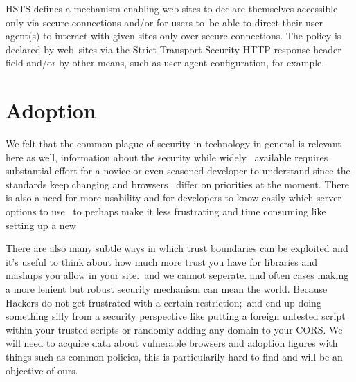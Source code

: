 HSTS defines a mechanism enabling web sites to declare themselves accessible only via secure connections and/or for users to\
be able to direct their user agent(s) to interact with given sites only over secure connections. The policy is declared by web\
sites via the Strict-Transport-Security HTTP response header field and/or by other means, such as user agent configuration, for example.\\

\section{Adoption}

We felt that the common plague of security in technology in general is relevant here as well, information about the security while widely \
available requires substantial effort for a novice or even seasoned developer to understand since the standards keep changing and browsers \
differ on priorities at the moment. There is also a need for more usability and for developers to know easily which server options to use \
to perhaps make it less frustrating and time consuming like setting up a new 

There are also many subtle ways in which trust boundaries can be exploited and it's useful to think about how much more trust you have for libraries and mashups you allow in your site.\
and we cannot seperate. and often cases making a more lenient but robust security mechanism can mean the world. Because Hackers do not get frustrated with a certain restriction;\
and end up doing something silly from a security perspective like putting a foreign untested script within your trusted scripts or randomly adding any domain to your CORS.
We will need to acquire data about vulnerable browsers and adoption figures with things such as common policies, this is particularily hard to find and will be an objective of ours.\

